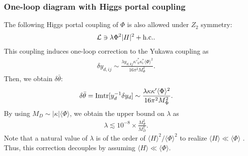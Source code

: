 \documentclass[11pt,a4paper]{article}
\begin{document}
\subsubsection*{One-loop diagram with Higgs portal coupling}
The following Higgs portal coupling of $\Phi$ is also allowed under $Z_2$ symmetry:
\begin{align}
    {\cal L} \ni \lambda \Phi^2 |H|^2 + {\rm h.c.}. \label{eq:phi higgs}
\end{align}
This coupling induces one-loop correction to the Yukawa coupling as  \cite{Bento:1991ez,Dine:2015jga}
\begin{align}
    \delta y_{d,ij} \sim \frac{\lambda y_{d,kj} {\kappa'}^*_{k} \kappa^*_{i} \langle \Phi \rangle^2  }{16\pi^2 M_\Phi^2}.
\end{align}
Then, we obtain $\delta \bar\theta$:
\begin{align}
    \delta \bar\theta = {\rm Im}{\rm tr}[y_d^{-1} \delta y_d] \sim \frac{\lambda \kappa \kappa' \langle \Phi \rangle^2 }{16\pi^2 M_\Phi^2}.
\end{align}
By using $M_D \sim |\kappa| \langle \Phi \rangle$, we obtain the upper bound on $\lambda$ as
\begin{align}
    \lambda \lesssim 10^{-8} \times \frac{M_\Phi^2}{M_D^2}. \label{eq:quality higgsportal}
\end{align}
Note that a natural value of $\lambda$ is of the order of $\langle H\rangle^2 / \langle\Phi\rangle^2$ to realize $\langle H \rangle \ll \langle\Phi\rangle$ \cite{Bento:1991ez}. Thus, this correction decouples by assuming $\langle H \rangle \ll \langle\Phi\rangle$.
\end{document}
